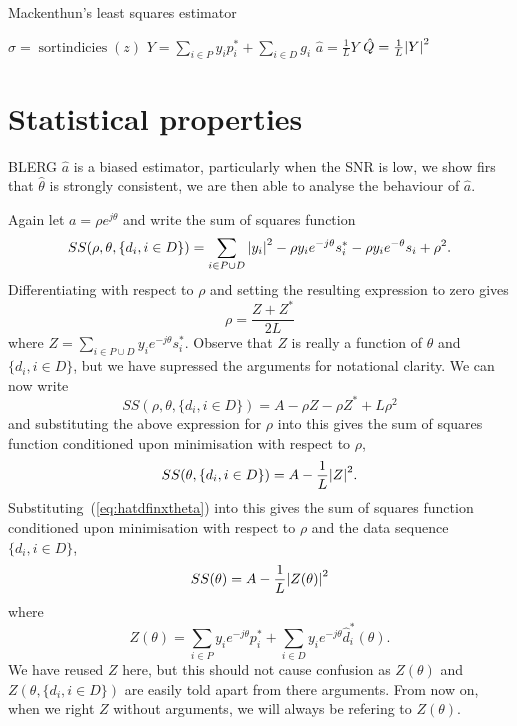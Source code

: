 \documentclass[a4paper,10pt]{article}
\begin{document}
\begin{algorithm} \label{alg:loglinear}
\SetAlCapFnt{\small}
\SetAlTitleFnt{}
\caption{Mackenthun's least squares estimator}
\DontPrintSemicolon
{}
$\sigma = \operatorname{sortindicies}(z)$  \;
$Y = \sum_{i \in P} y_i p_i^* + \sum_{i \in D} g_i $ \;
$\hat{a} = \frac{1}{L} Y$ \;
$\hat{Q} = \frac{1}{L}{\left| Y \right|}^2$  \;
\end{algorithm}



\section{Statistical properties}

BLERG $\hat{a}$ is a biased estimator, particularly when the SNR is low, we show firs that $\hat{\theta}$ is strongly consistent, we are then able to analyse the behaviour of $\hat{a}$.

Again let $a = \rho e^{j\theta}$ and write the sum of squares function  
\[
SS(\rho, \theta, \{d_i, i \in D\}) = \sum_{i \in P \cup D} {\left| y_i \right|}^2 - \rho y_i e^{-j\theta} s_i^* - \rho y_i e^{-\theta} s_i + \rho^2.
\]
Differentiating with respect to $\rho$ and setting the resulting expression to zero gives 
\[
\rho = \frac{Z + Z^*}{2L}
\]
where $Z = \sum_{i\in P \cup D}y_i e^{-j\theta} s_i^*$.  Observe that $Z$ is really a function of $\theta$ and $\{d_i, i \in D\}$, but we have supressed the arguments for notational clarity.  We can now write
\[
SS(\rho, \theta, \{d_i, i \in D\}) = A - \rho Z - \rho Z^* + L \rho^2
\]
and substituting the above expression for $\rho$ into this gives the sum of squares function conditioned upon minimisation with respect to $\rho$,
\[
SS(\theta, \{d_i, i \in D\}) = A - \frac{1}{L}{\left| Z \right|}^2.
\]
Substituting~(\ref{eq:hatdfinxtheta}) into this gives the sum of squares function conditioned upon minimisation with respect to $\rho$ and the data sequence $\{d_i, i \in D\}$,
\[
SS(\theta) = A - \frac{1}{L}{\left| Z(\theta) \right|}^2
\]
where
\[
Z(\theta)  = \sum_{i \in P} y_i e^{-j\theta} p_i^* + \sum_{i \in D} y_i e^{-j\theta} \hat{d}_i^*(\theta).
\]
We have reused $Z$ here, but this should not cause confusion as $Z(\theta)$ and $Z(\theta, \{d_i, i \in D\})$ are easily told apart from there arguments.  From now on, when we right $Z$ without arguments, we will always be refering to $Z(\theta)$.
\end{document}
